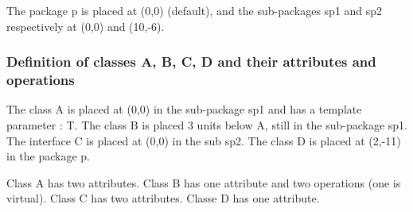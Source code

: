 \documentclass[a4paper,11pt]{report}
\newcommand{\inputTikZ}[1]{%
  }%
\newcommand{\inputTikZ}[1]{%
    \texttt{[image: fig/\#1.pdf]}%
  }%
\begin{document}
The package p is placed at (0,0) (default), and the sub-packages sp1 and sp2 respectively at (0,0) and (10,-6).

{\color{red!70!black}
\vspace{-0.4cm}
\vspace{-0.4cm}
\vspace{-0.4cm}

}

\begin{center}
\inputTikZ{classdiagstep1}
\end{center}

\subsubsection{Definition of classes A, B, C, D and their attributes and operations}

The class A is placed at (0,0) in the sub-package sp1 and has a template parameter : T. The class B is placed 3 units below A, still in the sub-package sp1. The interface C is placed at (0,0) in the sub sp2. 
The class D is placed at (2,-11) in the package p.

Class A has two attributes. Class B has one attribute and two operations (one is virtual). Class C has two attributes. Classe D has one attribute.

\vspace{-0.4cm}
{\color{red!70!black}
\vspace{-0.4cm}
}
\vspace{-0.4cm}
{\color{red!70!black}
\vspace{-0.4cm}
}
\vspace{-0.4cm}
{\color{red!70!black}
\vspace{-0.4cm}
}


\begin{center}
\inputTikZ{classdiagstep2}
\end{center}
\end{document}
